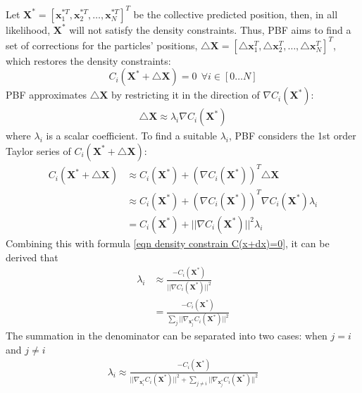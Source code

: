 Let $\textbf{X}^*=[\textbf{x}_1^{*T},\textbf{x}_2^{*T},\dots,\textbf{x}_N^{*T}]^T$ be the collective predicted position, then, in all likelihood, $\textbf{X}^*$ will not satisfy the density constraints. Thus, PBF aims to find a set of corrections for the particles' positions, $\triangle\textbf{X}=[\triangle\textbf{x}_1^T,\triangle\textbf{x}_2^T,\dots,\triangle\textbf{x}_N^T]^T$, which restores the density constraints:
\begin{equation}
    \label{eqn density constrain C(x+dx)=0}
    C_i(\textbf{X}^* + \triangle\textbf{X}) = 0~~\forall i \in [0\dots N]
\end{equation}
PBF approximates $\triangle\textbf{X}$ by restricting it in the direction of $\nabla C_i(\textbf{X}^*)$:
\begin{equation}
    \begin{aligned}
        \triangle\textbf{X} \approx  \lambda_i \nabla C_i(\textbf{X}^*)
    \end{aligned}
\end{equation}
where $\lambda_i$ is a scalar coefficient. To find a suitable $\lambda_i$, PBF considers the 1st order Taylor series of $C_i(\textbf{X}^* + \triangle\textbf{X})$:
\begin{equation}
    \begin{aligned}
        C_i(\textbf{X}^* + \triangle\textbf{X}) 
        &\approx  C_i(\textbf{X}^*) + (\nabla C_i(\textbf{X}^*))^T \triangle\textbf{X} \\
        &\approx  C_i(\textbf{X}^*) + (\nabla C_i(\textbf{X}^*))^T  \nabla C_i(\textbf{X}^*) \lambda_i \\
        &=  C_i(\textbf{X}^*) + ||\nabla C_i(\textbf{X}^*)||^2  \lambda_i
    \end{aligned}
\end{equation}
Combining this with formula \ref{eqn density constrain C(x+dx)=0}, it can be derived that
\begin{equation}
    \label{eqn lambda i basic}
    \begin{aligned}
        \lambda_i &\approx \frac{-C_i(\textbf{X}^*)}{||\nabla C_i(\textbf{X}^*)||^2}\\
        &= \frac{-C_i(\textbf{X}^*)}{ \sum_{j} ||\nabla_{\textbf{x}^*_j} C_i(\textbf{X}^*)||^2}
    \end{aligned}
\end{equation}
The summation in the denominator can be separated into two cases: when $j=i$ and $j\neq i$
\begin{equation}
    \label{eqn lambda i expanded}
    \begin{aligned}
        \lambda_i  \approx\frac{-C_i(\textbf{X}^*)}{ ||\nabla_{\textbf{x}^*_i} C_i(\textbf{X}^*)||^2 + \sum_{j\neq i} ||\nabla_{\textbf{x}^*_j} C_i(\textbf{X}^*)||^2}\\
    \end{aligned}
\end{equation}

